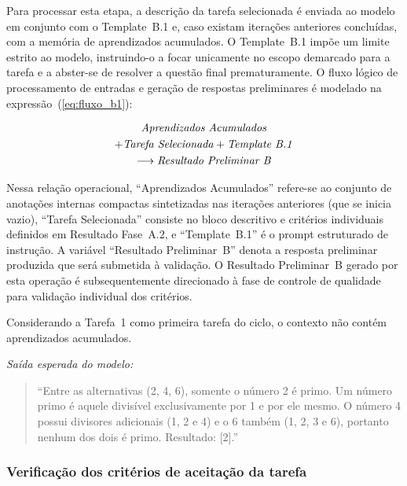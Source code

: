 \documentclass[a4paper,10pt,twocolumn]{article}
\newcommand{\saidaLLM}{%
  \smallskip\noindent\textit{Saída esperada do modelo:}\smallskip\par
}
\begin{document}
Para processar esta etapa, a descrição da tarefa selecionada é enviada ao modelo em conjunto com o Template~B.1 e, caso existam iterações anteriores concluídas, com a memória de aprendizados acumulados. O Template~B.1 impõe um limite estrito ao modelo, instruindo-o a focar unicamente no escopo demarcado para a tarefa e a abster-se de resolver a questão final prematuramente. O fluxo lógico de processamento de entradas e geração de respostas preliminares é modelado na expressão~(\ref{eq:fluxo_b1}):

\begin{multline} \label{eq:fluxo_b1}
\text{\textit{Aprendizados Acumulados}} \\
+ \text{\textit{Tarefa Selecionada}} + \text{\textit{Template B.1}} \\
\longrightarrow \text{\textit{Resultado Preliminar B}}
\end{multline}

Nessa relação operacional, ``Aprendizados Acumulados'' refere-se ao conjunto de anotações internas compactas sintetizadas nas iterações anteriores (que se inicia vazio), ``Tarefa Selecionada'' consiste no bloco descritivo e critérios individuais definidos em Resultado Fase~A.2, e ``Template~B.1'' é o prompt estruturado de instrução. A variável ``Resultado Preliminar~B'' denota a resposta preliminar produzida que será submetida à validação. O Resultado Preliminar~B gerado por esta operação é subsequentemente direcionado à fase de controle de qualidade para validação individual dos critérios.

\begin{exemplo}
Considerando a Tarefa~1 como primeira tarefa do ciclo, o contexto não contém aprendizados acumulados.

\saidaLLM

\begin{quote}
``Entre as alternativas (2, 4, 6), somente o número 2 é primo. Um número primo é aquele divisível exclusivamente por 1 e por ele mesmo. O número 4 possui divisores adicionais (1, 2 e 4) e o 6 também (1, 2, 3 e 6), portanto nenhum dos dois é primo. Resultado: [2].''
\end{quote}
\end{exemplo}


\subsubsection{Verificação dos critérios de aceitação da tarefa} \label{subsec:ExecucaoB2}
\end{document}

